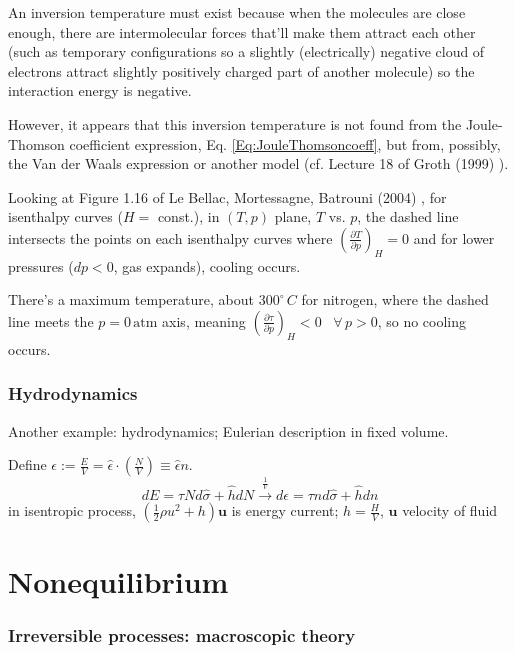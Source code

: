 \documentclass[10pt]{amsart}
\begin{document}
\begin{multicols*}{2}
An inversion temperature must exist because when the molecules are close enough, there are intermolecular forces that'll make them attract each other (such as temporary configurations so a slightly (electrically) negative cloud of electrons attract slightly positively charged part of another molecule) so the interaction energy is negative.  

However, it appears that this inversion temperature is not found from the Joule-Thomson coefficient expression, Eq. \ref{Eq:JouleThomsoncoeff}, but from, possibly, the Van der Waals expression or another model (cf. Lecture 18 of Groth (1999) \cite{EGroth1999}).  

Looking at Figure 1.16 of  Le Bellac, Mortessagne, Batrouni (2004) \cite{MLeBellacFMortessagneGBatrouni2004}, for isenthalpy curves ($H=$ const.), in $(T,p)$ plane, $T$ vs. $p$, the dashed line intersects the points on each isenthalpy curves where $\left( \frac{ \partial T}{ \partial p } \right)_H =0$ and for lower pressures ($dp<0$, gas expands), cooling occurs.  

There's a maximum temperature, about $300^{\circ} \, C$ for nitrogen, where the dashed line meets the $p=0 \, \text{atm}$ axis, meaning $\left( \frac{ \partial \tau}{ \partial p} \right)_H <0$ \, $\forall \, p >0$, so no cooling occurs.  

\section{Hydrodynamics}

Another example: hydrodynamics; Eulerian description in fixed volume.  

Define $\epsilon := \frac{ E}{V} = \widehat{\epsilon} \cdot \left( \frac{N}{V} \right) \equiv \widehat{\epsilon} n$.  
\[
dE = \tau N d\widehat{\sigma} + \widehat{h} dN \xrightarrow{ \frac{1}{V} } d\epsilon = \tau n d\widehat{\sigma} + \widehat{h} dn 
\]
in isentropic process, $\left( \frac{1}{2} \rho u^2 + h \right) \mathbf{u}$ is energy current; $h= \frac{H}{V}$, $\mathbf{u}$ velocity of fluid




\part{Nonequilibrium}

\section{Irreversible processes: macroscopic theory}


\end{multicols*}
\end{document}
